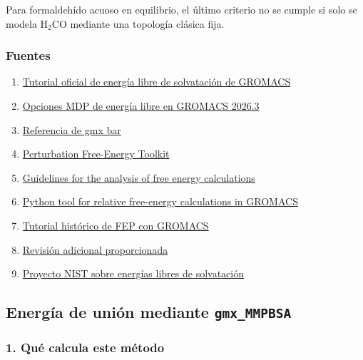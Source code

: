 \documentclass[
  spanish,
  11pt,
  a4paper]{article}
\providecommand{\tightlist}{%
  \setlength{\itemsep}{0pt}\setlength{\parskip}{0pt}}
\begin{document}
Para formaldehído acuoso en equilibrio, el último criterio no se cumple
si solo se modela \(\mathrm{H_2CO}\) mediante una topología clásica
fija.

\subsubsection{Fuentes}\label{fuentes-5}

\begin{enumerate}
\def\labelenumi{\arabic{enumi}.}
\tightlist
\item
  \href{https://tutorials.gromacs.org/docs/free-energy-of-solvation.html}{Tutorial
  oficial de energía libre de solvatación de GROMACS}
\item
  \href{https://manual.gromacs.org/current/user-guide/mdp-options.html}{Opciones
  MDP de energía libre en GROMACS 2026.3}
\item
  \href{https://manual.gromacs.org/current/onlinehelp/gmx-bar.html}{Referencia
  de gmx bar}
\item
  \href{https://pmc.ncbi.nlm.nih.gov/articles/PMC8479811/}{Perturbation
  Free-Energy Toolkit}
\item
  \href{https://link.springer.com/article/10.1007/s10822-015-9840-9}{Guidelines
  for the analysis of free energy calculations}
\item
  \href{https://link.springer.com/article/10.1007/s10822-015-9873-0}{Python
  tool for relative free-energy calculations in GROMACS}
\item
  \href{http://www.mdtutorials.com/gmx/2018/free_energy/index.html}{Tutorial
  histórico de FEP con GROMACS}
\item
  \href{https://pmc.ncbi.nlm.nih.gov/articles/PMC12163693/}{Revisión
  adicional proporcionada}
\item
  \href{https://www.nist.gov/programs-projects/solvation-free-energies}{Proyecto
  NIST sobre energías libres de solvatación}
\end{enumerate}

\subsection{\texorpdfstring{Energía de unión mediante
\texttt{gmx\_MMPBSA}}{Energía de unión mediante gmx\_MMPBSA}}\label{energuxeda-de-uniuxf3n-mediante-gmx_mmpbsa}

\subsubsection{1. Qué calcula este
método}\label{quuxe9-calcula-este-muxe9todo}
\end{document}
